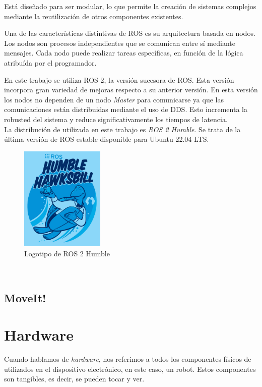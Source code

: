 Está diseñado para ser modular, lo que permite la creación de sistemas complejos mediante la reutilización de otros componentes existentes.

Una de las características distintivas de ROS es su arquitectura basada en nodos. Los nodos son procesos independientes 
que se comunican entre sí mediante mensajes. Cada nodo puede realizar tareas específicas, en función de la lógica atribuída por el programador.

En este trabajo se utiliza ROS 2, la versión sucesora de ROS. Esta versión incorpora gran variedad de mejoras respecto a su anterior versión. En esta versión 
los nodos no dependen de un nodo \textit{Master} para comunicarse ya que las comunicaciones están distribuidas mediante el uso de \ac{DDS}. Esto 
incrementa la robusted del sistema y reduce significativamente los tiempos de latencia. \\
La distribución de utilizada en este trabajo es \textit{ROS 2 Humble}. Se trata de la última versión de ROS estable disponible para Ubuntu 22.04 LTS.
\begin{figure} [h!]
  \begin{center}
    \includegraphics[width=4cm]{figs/ros2logo.jpeg}
  \end{center}
  \caption{Logotipo de ROS 2 Humble}
  \label{fig:ros2logo}
\end{figure}\ 

\subsection{MoveIt!}
\label{subsec:moveit}

\section{Hardware}
\label{sec:hardware}
Cuando hablamos de \textit{hardware}, nos referimos a todos los componentes físicos de utilizados en el dispositivo electrónico, en este caso, un robot. Estos 
componentes son tangibles, es decir, se pueden tocar y ver.
